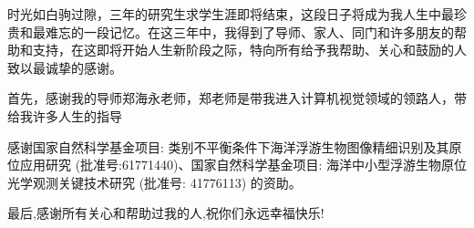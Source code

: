 \begin{acknowledgement}
时光如白驹过隙，三年的研究生求学生涯即将结束，这段日子将成为我人生中最珍贵和最难忘的一段记忆。在这三年中，我得到了导师、家人、同门和许多朋友的帮助和支持，在这即将开始人生新阶段之际，特向所有给予我帮助、关心和鼓励的人致以最诚挚的感谢。

首先，感谢我的导师郑海永老师，郑老师是带我进入计算机视觉领域的领路人，带给我许多人生的指导




感谢国家自然科学基金项目: 类别不平衡条件下海洋浮游生物图像精细识别及其原位应用研究 (批准号:61771440)、国家自然科学基金项目: 海洋中小型浮游生物原位光学观测关键技术研究 (批准号: 41776113) 的资助。

最后,感谢所有关心和帮助过我的人,祝你们永远幸福快乐!

\end{acknowledgement}
